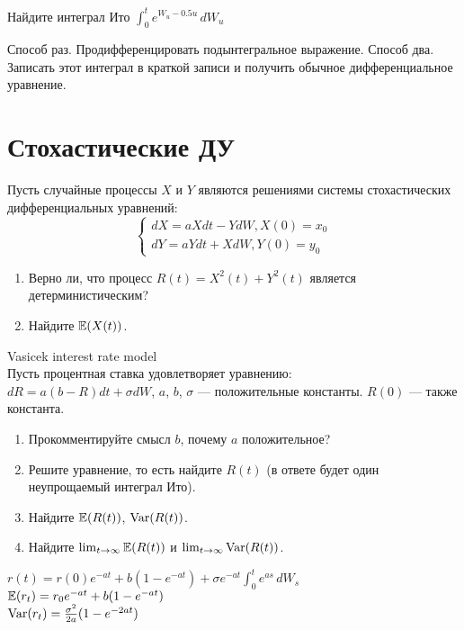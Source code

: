 \begin{problem}
Найдите интеграл Ито $\int_0^t e^{W_u - 0.5 u} \, dW_u$


\begin{sol}
Способ раз. Продифференцировать подынтегральное выражение. Способ два. Записать этот интеграл в краткой записи и получить обычное дифференциальное уравнение.
\end{sol}
\end{problem}

\section{Стохастические ДУ}

\begin{problem}
Пусть случайные процессы $X$ и $Y$ являются решениями системы стохастических дифференциальных уравнений:
\[
\begin{cases}
dX=aXdt-YdW, X(0)=x_{0} \\
dY=aYdt+XdW, Y(0)=y_{0}
\end{cases}
\]
\begin{enumerate}
\item Верно ли, что процесс $R(t)=X^{2}(t)+Y^{2}(t)$ является детерминистическим?
\item Найдите $\mathbb{E}(X(t))$.
\end{enumerate}


\begin{sol}

\end{sol}
\end{problem}

\begin{problem}
 Vasicek interest rate model \\
Пусть процентная ставка удовлетворяет уравнению: \\
$dR=a(b-R)dt+\sigma dW$, $a$, $b$, $\sigma$ — положительные константы. $R(0)$ — также константа.
\begin{enumerate}
\item Прокомментируйте смысл $b$, почему $a$ положительное?
\item Решите уравнение, то есть найдите $R(t)$ (в ответе будет один неупрощаемый интеграл Ито).
\item Найдите $\mathbb{E}(R(t))$, $\operatorname{Var}(R(t))$.
\item Найдите $\lim_{t\rightarrow\infty}\mathbb{E}(R(t))$ и $\lim_{t\rightarrow\infty}\operatorname{Var}(R(t))$.
\end{enumerate}

\begin{sol}


$ r(t) = r(0) e^{-a t} +  b \left(1- e^{-a t}\right) + \sigma e^{-a t}\int_0^t e^{a s}\,dW_s$ \\
$\mathbb{E}(r_t)=r_{0}e^{-at}+b(1-e^{-at})$ \\
$\operatorname{Var}(r_t) = \frac{\sigma^2}{2 a}(1 - e^{-2at})$
\end{sol}
\end{problem}

